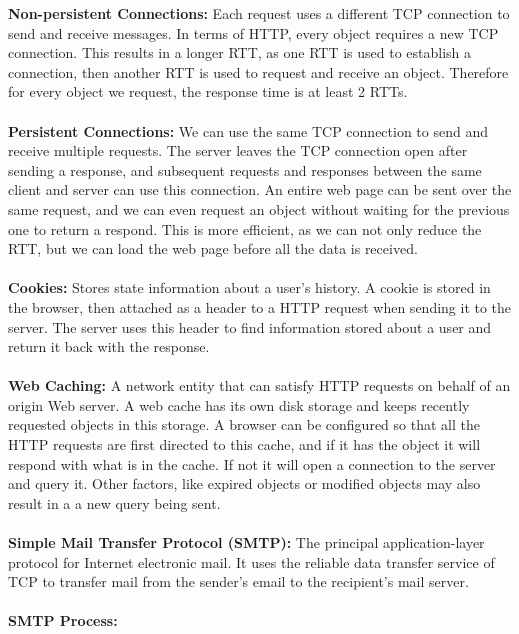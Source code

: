 \documentclass[]{article}
\begin{document}
\textcolor{Emerald}{\textbf{Non-persistent Connections:}} Each request uses a different TCP connection to send and receive messages. In terms of HTTP, every object requires a new TCP connection. This results in a longer RTT, as one RTT is used to establish a connection, then another RTT is used to request and receive an object. Therefore for every object we request, the response time is at least 2 RTTs. \\\\
\textcolor{Emerald}{\textbf{Persistent Connections:}} We can use the same TCP connection to send and receive multiple requests. The server leaves the TCP connection open after sending a response, and subsequent requests and responses between the same client and server can use this connection. An entire web page can be sent over the same request, and we can even request an object without waiting for the previous one to return a respond. This is more efficient, as we can not only reduce the RTT, but we can load the web page before all the data is received. \\\\
\textcolor{Emerald}{\textbf{Cookies:}} Stores state information about a user's history. A cookie is stored in the browser, then attached as a header to a HTTP request when sending it to the server. The server uses this header to find information stored about a user and return it back with the response. \\\\
\textcolor{Emerald}{\textbf{Web Caching:}} A network entity that can satisfy HTTP requests on behalf of an origin Web server. A web cache has its own disk storage and keeps recently requested objects in this storage. A browser can be configured so that all the HTTP requests are first directed to this cache, and if it has the object it will respond with what is in the cache. If not it will open a connection to the server and query it. Other factors, like expired objects or modified objects may also result in a a new query being sent.\\\\
\textcolor{Emerald}{\textbf{Simple Mail Transfer Protocol (SMTP):}} The principal application-layer protocol for Internet electronic mail. It uses the reliable data transfer service of TCP to transfer mail from the sender's email to the recipient's mail server. \\\\
\textcolor{Emerald}{\textbf{SMTP Process:}} 
\end{document}

